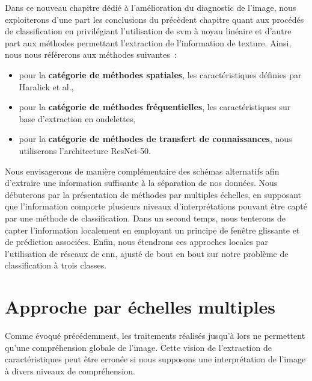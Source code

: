 Dans ce nouveau chapitre dédié à l'amélioration du diagnostic de l'image, nous exploiterons d'une part les conclusions du précèdent chapitre quant aux procédés de classification en privilégiant l'utilisation de \gls{svm} à noyau linéaire et d'autre part aux méthodes permettant l'extraction de l'information de texture. Ainsi, nous nous référerons aux méthodes suivantes~:
\begin{itemize}
    \item pour la \textbf{catégorie de méthodes spatiales}, les caractéristiques définies par Haralick et al.,
    \item pour la \textbf{catégorie de méthodes fréquentielles}, les caractéristiques sur base d'extraction en ondelettes,
    \item pour la \textbf{catégorie de méthodes de transfert de connaissances}, nous utiliserons l'architecture ResNet-50.
\end{itemize}\par

Nous envisagerons de manière complémentaire des schémas alternatifs afin d'extraire une information suffisante à la séparation de nos données. Nous débuterons par la présentation de méthodes par multiples échelles, en supposant que l'information comporte plusieurs niveaux d'interprétations pouvant être capté par une méthode de classification. Dans un second temps, nous tenterons de capter l'information localement en employant un principe de fenêtre glissante et de prédiction associées. Enfin, nous étendrons ces approches locales par l'utilisation de réseaux de \gls{cnn}, ajusté de bout en bout sur notre problème de classification à trois classes.\par
\clearpage

\section{Approche par échelles multiples}
Comme évoqué précédemment, les traitements réalisés jusqu'à lors ne permettent qu'une compréhension globale de l'image. Cette vision de l'extraction de caractéristiques peut être erronée si nous supposons une interprétation de l'image à divers niveaux de compréhension.\par

